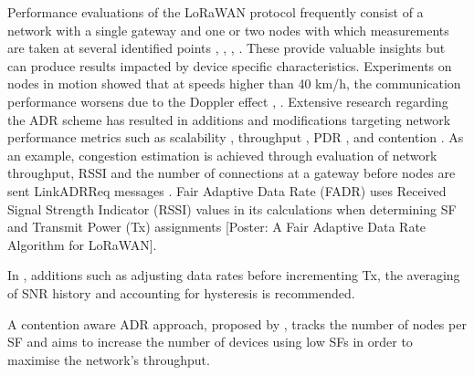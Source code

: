 Performance evaluations of the LoRaWAN protocol frequently consist of a network with a single gateway and one or two nodes with which measurements are taken at several identified points \cite{marais_lora_2017},
	\cite{aref_free_2014},
	\cite{petajajarvi_coverage_2015},
	\cite{augustin_study_2016}.
These provide valuable insights but can produce results impacted by device specific characteristics.
Experiments on nodes in motion showed that at speeds higher than 40 km/h,
	the communication performance worsens due to the Doppler effect \cite{petajajarvi_performance_2017},
	\cite{sanchez-iborra_performance_2018}.
Extensive research regarding the ADR scheme has resulted in additions and modifications targeting network performance metrics such as scalability \cite{kim_adaptive_2017},
	throughput \cite{cuomo_explora_2017},
	PDR \cite{reynders_power_2017},
	and contention \cite{kim_contention-aware_2018}.
As an example,
	congestion estimation is achieved through evaluation of network throughput,
	RSSI and the number of connections at a gateway before nodes are sent LinkADRReq messages \cite{kim_adaptive_2017}.
Fair Adaptive Data Rate (FADR) uses Received Signal Strength Indicator (RSSI) values in its calculations when determining SF and Transmit Power (Tx) assignments [Poster:
	A Fair Adaptive Data Rate Algorithm for LoRaWAN].

In \cite{hauser_proposal_2017},
	additions such as adjusting data rates before incrementing Tx,
	the averaging of SNR history and accounting for hysteresis is recommended.

A contention aware ADR approach,
	proposed by \cite{kim_contention-aware_2018},
	tracks the number of nodes per SF and aims to increase the number of devices using low SFs in order to maximise the network’s throughput.


